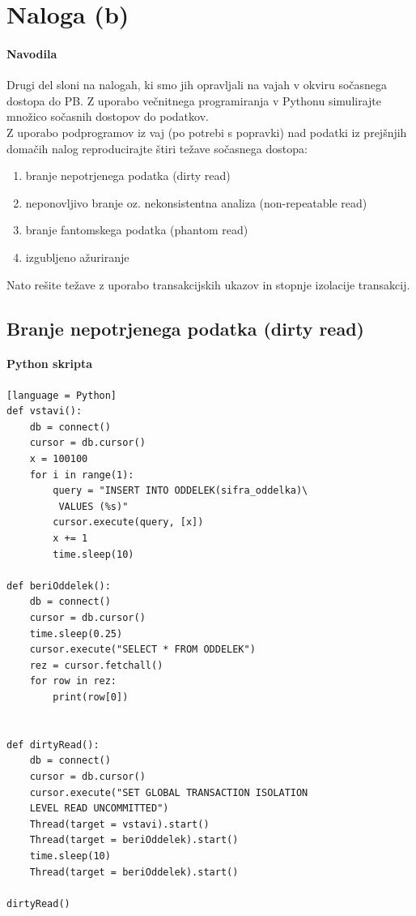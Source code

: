 \documentclass[a4paper,11pt]{report}
\begin{document}
\section*{Naloga (b)}
\paragraph{Navodila}
\begin{em}
    Drugi del sloni na nalogah, ki smo jih opravljali na vajah v okviru sočasnega dostopa do PB. Z uporabo večnitnega programiranja v Pythonu simulirajte množico sočasnih dostopov do podatkov. 
    \\Z uporabo podprogramov iz vaj (po potrebi s popravki) nad podatki iz prejšnjih domačih nalog reproducirajte štiri težave sočasnega dostopa:
    \begin{enumerate}
        \item branje nepotrjenega podatka (dirty read)
        \item neponovljivo branje oz. nekonsistentna analiza (non-repeatable read)
        \item branje fantomskega podatka (phantom read)
        \item izgubljeno ažuriranje
    \end{enumerate}

    Nato rešite težave z uporabo transakcijskih ukazov in stopnje izolacije transakcij.
\end{em}

\pagebreak
\subsection*{Branje nepotrjenega podatka (dirty read)}

\paragraph{Python skripta}\mbox{}

\begin{lstlisting}[showstringspaces=false][language = Python]
def vstavi():
    db = connect()
    cursor = db.cursor()
    x = 100100
    for i in range(1):
        query = "INSERT INTO ODDELEK(sifra_oddelka)\
         VALUES (%s)"
        cursor.execute(query, [x])
        x += 1
        time.sleep(10)

def beriOddelek():
    db = connect()
    cursor = db.cursor()
    time.sleep(0.25)
    cursor.execute("SELECT * FROM ODDELEK")
    rez = cursor.fetchall()
    for row in rez:
        print(row[0])

    
def dirtyRead():
    db = connect()
    cursor = db.cursor()
    cursor.execute("SET GLOBAL TRANSACTION ISOLATION 
    LEVEL READ UNCOMMITTED")
    Thread(target = vstavi).start()
    Thread(target = beriOddelek).start()
    time.sleep(10)
    Thread(target = beriOddelek).start()

dirtyRead()
\end{lstlisting}
\end{document}
